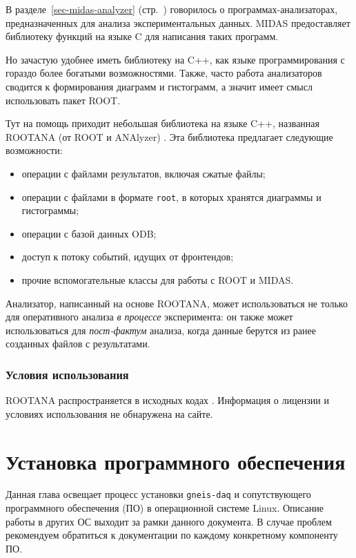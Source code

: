 \documentclass[12pt, a4paper, oneside, onecolumn]{book}
\newcommand{\GD}{{\tt gneis-daq}}
\newcommand{\MIDAS}{\mbox{MIDAS}}
\newcommand{\ROOT}{\mbox{ROOT}}
\newcommand{\ROOTANA}{\mbox{ROOTANA}}
\begin{document}
В разделе~\ref{sec-midas-analyzer} (стр.~\pageref{sec-midas-analyzer}) говорилось о программах-анализаторах, предназначенных для анализа экспериментальных данных. \MIDAS{} предоставляет библиотеку  функций на языке C для написания таких программ.

Но зачастую удобнее иметь библиотеку на C++, как языке программирования с гораздо более богатыми возможностями. Также, часто работа анализаторов сводится к формирования диаграмм и гистограмм, а значит имеет смысл использовать пакет \ROOT{}.

Тут на помощь приходит небольшая библиотека на языке C++, названная \ROOTANA{} (от \ROOT{} и ANAlyzer) \cite{MidasWikiRootana}. Эта библиотека предлагает следующие возможности:

\begin{itemize}
\item операции с файлами результатов, включая сжатые файлы;
\item операции с файлами в формате {\tt root}, в которых хранятся диаграммы и гистограммы;
\item операции с базой данных ODB;
\item доступ к потоку событий, идущих от фронтендов;
\item прочие вспомогательные классы для работы с \ROOT{} и \MIDAS{}.
\end{itemize}

Анализатор, написанный на основе \ROOTANA{}, может использоваться не только для оперативного анализа {\it в процессе} эксперимента: он также может использоваться для {\it пост-фактум} анализа, когда данные берутся из ранее созданных файлов с результатами.

\subsection{Условия использования}

\ROOTANA{} распространяется в исходных кодах \cite{RootanaHome}. Информация о лицензии и условиях использования не обнаружена на сайте.

\chapter{Установка программного обеспечения}

Данная глава освещает процесс установки \GD{} и сопутствующего программного обеспечения (ПО) в операционной системе Linux. Описание работы в других ОС выходит за рамки данного документа. В случае проблем рекомендуем обратиться к документации по каждому конкретному компоненту ПО.
\end{document}
